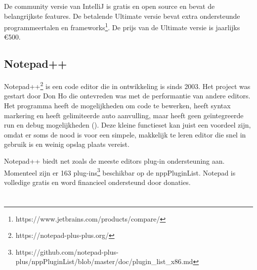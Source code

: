 De community versie van IntelliJ is gratis en open source en bevat de belangrijkste features. De betalende Ultimate versie bevat extra ondersteunde programmeertalen en frameworks\footnote{https://www.jetbrains.com/products/compare/}. De prijs van de Ultimate versie is jaarlijks \euro{}500.

\subsection{Notepad++}
Notepad++\footnote{https://notepad-plus-plus.org/} is een code editor die in ontwikkeling is sinds 2003. Het project was gestart door Don Ho die ontevreden was met de performantie van andere editors. Het programma heeft de mogelijkheden om code te bewerken, heeft syntax markering en heeft gelimiteerde auto aanvulling, maar heeft geen geïntegreerde run en debug mogelijkheden (\textcite{Contributors2017}). Deze kleine functieset kan juist een voordeel zijn, omdat er soms de nood is voor een simpele, makkelijk te leren editor die snel in gebruik is en weinig opslag plaats vereist.

Notepad++ biedt net zoals de meeste editors plug-in ondersteuning aan. Momenteel zijn er 163 plug-ins\footnote{https://github.com/notepad-plus-plus/nppPluginList/blob/master/doc/plugin\_list\_x86.md} beschikbar op de nppPluginList. Notepad is volledige gratis en word financieel ondersteund door donaties.

\newpage

\section{}

\newcommand{\requirementsNotepadFN}{\footnote{https://www.getpcapps.com/software/development/notepad-plus-plus-code-editor-installer-setup-windows.html}}
\newcommand{\requirementsVSCodeFN}{\footnote{https://code.visualstudio.com/docs/supporting/requirements}}
\newcommand{\requirementsEclipseFN}{\footnote{https://www.tabnine.com/blog/intellij-idea-vs-eclipse/}}
\newcommand{\requirementsIntelliJFN}{\footnote{https://www.jetbrains.com/help/idea/installation-guide.html}}
\newcommand{\requirementsVisualStudioFN}{\footnote{https://docs.microsoft.com/en-us/visualstudio/releases/2022/system-requirements}}

